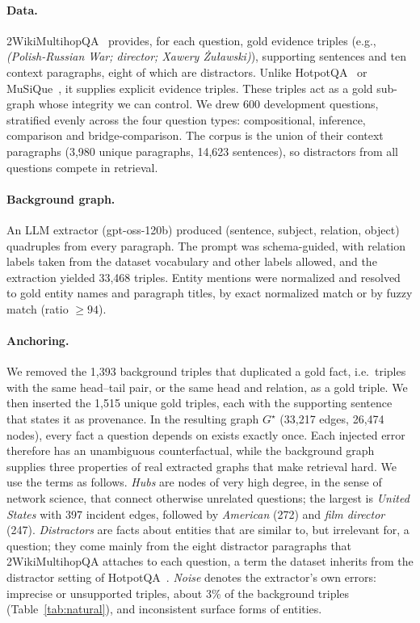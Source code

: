 \documentclass[11pt]{article}
\begin{document}
\paragraph{Data.} 2WikiMultihopQA~\cite{ho2020twowiki} provides, for each question, gold evidence triples (e.g., \emph{(Polish-Russian War; director; Xawery \.Zu\l{}awski)}), supporting sentences and ten context paragraphs, eight of which are distractors. Unlike HotpotQA~\cite{yang2018hotpotqa} or MuSiQue~\cite{trivedi2022musique}, it supplies explicit evidence triples. These triples act as a gold sub-graph whose integrity we can control. We drew 600 development questions, stratified evenly across the four question types: compositional, inference, comparison and bridge-comparison. The corpus is the union of their context paragraphs (3,980 unique paragraphs, 14,623 sentences), so distractors from all questions compete in retrieval.

\paragraph{Background graph.} An LLM extractor (gpt-oss-120b) produced (sentence, subject, relation, object) quadruples from every paragraph. The prompt was schema-guided, with relation labels taken from the dataset vocabulary and other labels allowed, and the extraction yielded 33,468 triples. Entity mentions were normalized and resolved to gold entity names and paragraph titles, by exact normalized match or by fuzzy match (ratio $\ge 94$).

\paragraph{Anchoring.} We removed the 1,393 background triples that duplicated a gold fact, i.e.\ triples with the same head--tail pair, or the same head and relation, as a gold triple. We then inserted the 1,515 unique gold triples, each with the supporting sentence that states it as provenance. In the resulting graph $G^\star$ (33,217 edges, 26,474 nodes), every fact a question depends on exists exactly once. Each injected error therefore has an unambiguous counterfactual, while the background graph supplies three properties of real extracted graphs that make retrieval hard. We use the terms as follows. \emph{Hubs} are nodes of very high degree, in the sense of network science, that connect otherwise unrelated questions; the largest is \emph{United States} with 397 incident edges, followed by \emph{American} (272) and \emph{film director} (247). \emph{Distractors} are facts about entities that are similar to, but irrelevant for, a question; they come mainly from the eight distractor paragraphs that 2WikiMultihopQA attaches to each question, a term the dataset inherits from the distractor setting of HotpotQA~\cite{yang2018hotpotqa}. \emph{Noise} denotes the extractor's own errors: imprecise or unsupported triples, about 3\% of the background triples (Table~\ref{tab:natural}), and inconsistent surface forms of entities.
\end{document}
